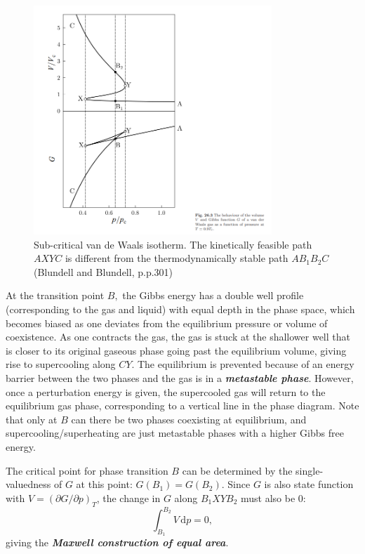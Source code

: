 \documentclass{article}
\theoremstyle{nonumberplain}
\begin{document}
\begin{figure}[ht]
    \centering
    \includegraphics[width=0.8\textwidth]{fig/Blundell-p301.png}
    \caption{Sub-critical van de Waals isotherm. The kinetically feasible path $AXYC$ is different from the thermodynamically stable path $AB_1B_2C$ (Blundell and Blundell, p.p.301)} 
    \label{fig:vdw-isotherm}
\end{figure}

At the transition point $B,$ the Gibbs energy has a double well profile (corresponding to the gas and liquid) with equal depth in the phase space, which becomes biased as one deviates from the equilibrium pressure or volume of coexistence. As one contracts the gas, the gas is stuck at the shallower well that is closer to its original gaseous phase going past the equilibrium volume, giving rise to supercooling along $CY.$ The equilibrium is prevented because of an energy barrier between the two phases and the gas is in a \textit{\textbf{metastable phase}}. However, once a perturbation energy is given, the supercooled gas will return to the equilibrium gas phase, corresponding to a vertical line in the phase diagram. Note that only at $B$ can there be two phases coexisting at equilibrium, and supercooling/superheating are just metastable phases with a higher Gibbs free energy. 

The critical point for phase transition $B$ can be determined by the single-valuedness of $G$ at this point: $G(B_1) = G(B_2). $ Since $G$ is also state function with $V = (\partial G / \partial p )_T$, the change in $G$ along $B_1XYB_2$ must also be 0: 
\[
    \int_{B_1}^{B_2} V  \,\mathrm{d}p =0,
\]
giving the \textit{\textbf{Maxwell construction of equal area}}.  
\end{document}
